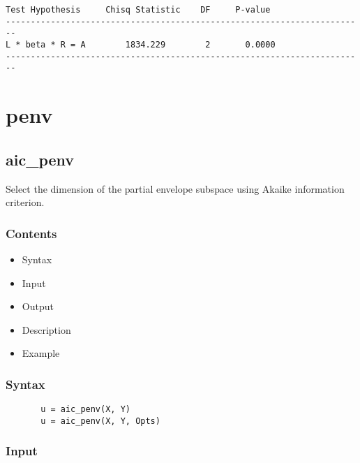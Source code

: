\documentclass[a4paper,11pt,openany]{memoir}
\begin{document}
        \color{lightgray}\ttfamily \begin{verbatim}
Test Hypothesis     Chisq Statistic    DF     P-value
------------------------------------------------------------------------
L * beta * R = A        1834.229        2       0.0000
------------------------------------------------------------------------
\end{verbatim} \rmfamily
\color{black}
    
\newpage 
    
\chapter{penv}

\rmfamily
\color{black}\section{aic\_penv}

\begin{par}
Select the dimension of the partial envelope subspace using Akaike information criterion.
\end{par} \vspace{1em}

\subsection*{Contents}

\begin{itemize}
\setlength{\itemsep}{-1ex}
   \item Syntax
   \item Input
   \item Output
   \item Description
   \item Example
\end{itemize}


\subsection*{Syntax}


\begin{verbatim}       u = aic_penv(X, Y)
       u = aic_penv(X, Y, Opts)\end{verbatim}
    

\subsection*{Input}
\end{document}
